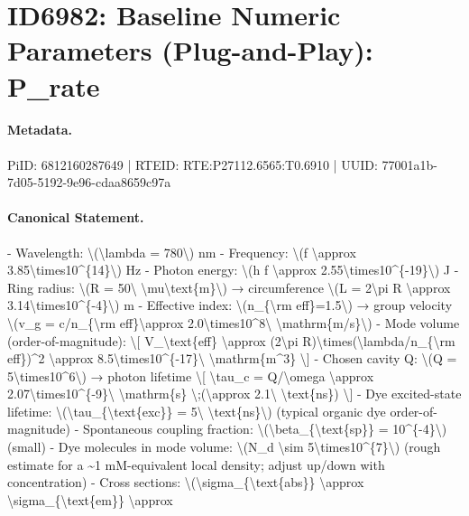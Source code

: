\section*{ID6982: Baseline Numeric Parameters (Plug-and-Play): P\_rate}
\paragraph{Metadata.}
PiID: 6812160287649 | RTEID: RTE:P27112.6565:T0.6910 | UUID: 77001a1b-7d05-5192-9e96-cdaa8659c97a

\paragraph{Canonical Statement.}
- Wavelength: \textbackslash{}(\textbackslash{}lambda = 780\textbackslash{}) nm - Frequency: \textbackslash{}(f \textbackslash{}approx 3.85\textbackslash{}times10\textasciicircum{}\{14\}\textbackslash{}) Hz - Photon energy: \textbackslash{}(h f \textbackslash{}approx 2.55\textbackslash{}times10\textasciicircum{}\{-19\}\textbackslash{}) J - Ring radius: \textbackslash{}(R = 50\textbackslash{} \textbackslash{}mu\textbackslash{}text\{m\}\textbackslash{}) → circumference \textbackslash{}(L = 2\textbackslash{}pi R \textbackslash{}approx 3.14\textbackslash{}times10\textasciicircum{}\{-4\}\textbackslash{}) m - Effective index: \textbackslash{}(n\_\{\textbackslash{}rm eff\}=1.5\textbackslash{}) → group velocity \textbackslash{}(v\_g = c/n\_\{\textbackslash{}rm eff\}\textbackslash{}approx 2.0\textbackslash{}times10\textasciicircum{}8\textbackslash{} \textbackslash{}mathrm\{m/s\}\textbackslash{}) - Mode volume (order-of-magnitude): \textbackslash{}[ V\_\textbackslash{}text\{eff\} \textbackslash{}approx (2\textbackslash{}pi R)\textbackslash{}times(\textbackslash{}lambda/n\_\{\textbackslash{}rm eff\})\textasciicircum{}2 \textbackslash{}approx 8.5\textbackslash{}times10\textasciicircum{}\{-17\}\textbackslash{} \textbackslash{}mathrm\{m\textasciicircum{}3\} \textbackslash{}] - Chosen cavity Q: \textbackslash{}(Q = 5\textbackslash{}times10\textasciicircum{}6\textbackslash{}) → photon lifetime \textbackslash{}[ \textbackslash{}tau\_c = Q/\textbackslash{}omega \textbackslash{}approx 2.07\textbackslash{}times10\textasciicircum{}\{-9\}\textbackslash{} \textbackslash{}mathrm\{s\} \textbackslash{};(\textbackslash{}approx 2.1\textbackslash{} \textbackslash{}text\{ns\}) \textbackslash{}] - Dye excited-state lifetime: \textbackslash{}(\textbackslash{}tau\_\{\textbackslash{}text\{exc\}\} = 5\textbackslash{} \textbackslash{}text\{ns\}\textbackslash{}) (typical organic dye order-of-magnitude) - Spontaneous coupling fraction: \textbackslash{}(\textbackslash{}beta\_\{\textbackslash{}text\{sp\}\} = 10\textasciicircum{}\{-4\}\textbackslash{}) (small) - Dye molecules in mode volume: \textbackslash{}(N\_d \textbackslash{}sim 5\textbackslash{}times10\textasciicircum{}\{7\}\textbackslash{}) (rough estimate for a \textasciitilde{}1 mM-equivalent local density; adjust up/down with concentration) - Cross sections: \textbackslash{}(\textbackslash{}sigma\_\{\textbackslash{}text\{abs\}\} \textbackslash{}approx \textbackslash{}sigma\_\{\textbackslash{}text\{em\}\} \textbackslash{}approx 